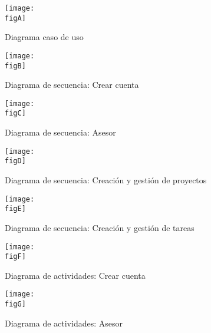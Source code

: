 	\restoregeometry %


	\clearpage
	\listoffigures



	\clearpage
	\vspace*{-16pt}
	\begin{center}
		{\textbf{\huge \theTitle}}
	\end{center}
	\vspace*{8pt}


	\begin{figure}[h]
		\centering
		\texttt{[image: \\figA]}
		\caption{Diagrama caso de uso}
	\end{figure}

	\begin{figure}[h]
		\centering
		\texttt{[image: \\figB]}
		\caption{Diagrama de secuencia: Crear cuenta}
	\end{figure}

	\begin{figure}[h]
		\centering
		\texttt{[image: \\figC]}
		\caption{Diagrama de secuencia: Asesor}
	\end{figure}

	\begin{figure}[h]
		\centering
		\texttt{[image: \\figD]}
		\caption{Diagrama de secuencia: Creación y gestión de proyectos}
	\end{figure}


	\begin{figure}[h]
		\centering
		\texttt{[image: \\figE]}
		\caption{Diagrama de secuencia: Creación y gestión de tareas}
	\end{figure}

	\begin{figure}[h]
		\centering
		\texttt{[image: \\figF]}
		\caption{Diagrama de actividades: Crear cuenta}
	\end{figure}

	\begin{figure}[h]
		\centering
		\texttt{[image: \\figG]}
		\caption{Diagrama de actividades: Asesor}
	\end{figure}

